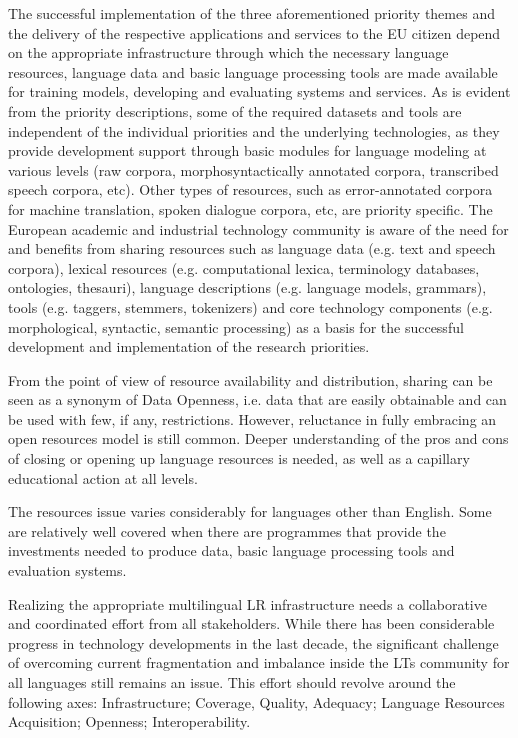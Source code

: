 \documentclass[10pt, plain]{../../metanetpaper}
\begin{document}
\begin{multicols}{2}

The successful implementation of the three aforementioned priority themes and the delivery of the respective applications and services to the EU citizen depend on the appropriate infrastructure through which the necessary language resources, language data and basic language processing tools are made available for training models, developing and evaluating systems and services. As is evident from the priority descriptions, some of the required datasets and tools are independent of the individual priorities and the underlying technologies, as they provide development support through basic modules for language modeling at various levels (raw corpora, morphosyntactically annotated corpora, transcribed speech corpora, etc). Other types of resources, such as error-annotated corpora for machine translation, spoken dialogue corpora, etc, are priority specific.  The European academic and industrial technology community is aware of the need for and benefits from sharing resources such as language data (e.g. text and speech corpora), lexical resources (e.g. computational lexica, terminology databases, ontologies, thesauri), language descriptions (e.g. language models, grammars), tools (e.g. taggers, stemmers, tokenizers) and core technology components (e.g. morphological, syntactic, semantic processing) as a basis for the successful development and implementation of the research priorities.

From the point of view of resource availability and distribution, sharing can be seen as a synonym of Data Openness, i.e. data that are easily obtainable and can be used with few, if any, restrictions. However, reluctance in fully embracing an open resources model is still common. Deeper understanding of the pros and cons of closing or opening up language resources is needed, as well as a capillary educational action at all levels.

The resources issue varies considerably for languages other than English. Some are relatively well covered when there are programmes that provide the investments needed to produce data, basic language processing tools and evaluation systems.

Realizing the appropriate multilingual LR infrastructure needs a collaborative and coordinated effort from all stakeholders. While there has been considerable progress in technology developments in the last decade, the significant challenge of overcoming current fragmentation and imbalance inside the LTs community for all languages still remains an issue. This effort should revolve around the following axes: Infrastructure; Coverage, Quality, Adequacy; Language Resources Acquisition; Openness; Interoperability.


\end{multicols}
\end{document}
